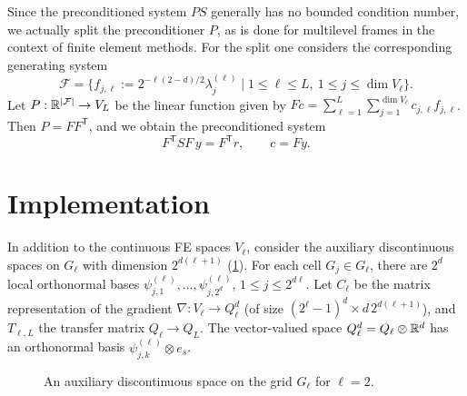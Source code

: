 Since the preconditioned system $PS$ generally has no bounded condition number,
we actually split the preconditioner $P$, as is done for multilevel frames in the
context of finite element methods. For the split one considers the corresponding
generating system
\begin{equation}
  \mathcal{F} = \{f_{j,\ell} := 2^{-\ell(2-d)/2}\lambda_j^{(\ell)} \mid 1 \le \ell \le L,\ 1 \le j \le \dim V_\ell\}.
\end{equation}
Let $P : \mathbb{R}^{\left\lvert \mathcal{F} \right\rvert} \to V_L$ be the linear function given by
$Fc = \sum_{\ell=1}^L \sum_{j=1}^{\dim V_\ell} c_{j,\ell} f_{j,\ell}$. Then
$P = FF^{\mathsf{T}}$, and we obtain the preconditioned system
\begin{equation}
  F^{\mathsf{T}} S F\, y = F^{\mathsf{T}} r, \qquad c = Fy.
  \label{eq:sec07-precond}
\end{equation}

\section{Implementation}\label{sec:sec07-impl}

In addition to the continuous FE spaces $V_\ell$, consider the auxiliary
discontinuous spaces on $G_\ell$ with dimension $2^{d(\ell+1)}$
(\cref{fig:sec07-grid}). For each cell $G_j \in G_\ell$, there are $2^d$ local
orthonormal bases $\psi_{j,1}^{(\ell)}, \dots, \psi_{j,2^d}^{(\ell)}$,
$1 \le j \le 2^{d\ell}$. Let $C_\ell$ be the matrix representation of the gradient
$\nabla : V_\ell \to Q_\ell^d$ (of size $(2^\ell - 1)^d \times d\,2^{d(\ell+1)}$),
and $T_{\ell, L}$ the transfer matrix $Q_\ell \to Q_L$. The vector-valued space
$Q_\ell^d = Q_\ell \otimes \mathbb{R}^d$ has an orthonormal basis
$\psi_{j,k}^{(\ell)} \otimes e_s$.

\begin{figure}[ht]
  \centering
  \caption{An auxiliary discontinuous space on the grid $G_\ell$ for $\ell = 2$.}
  \label{fig:sec07-grid}
\end{figure}

